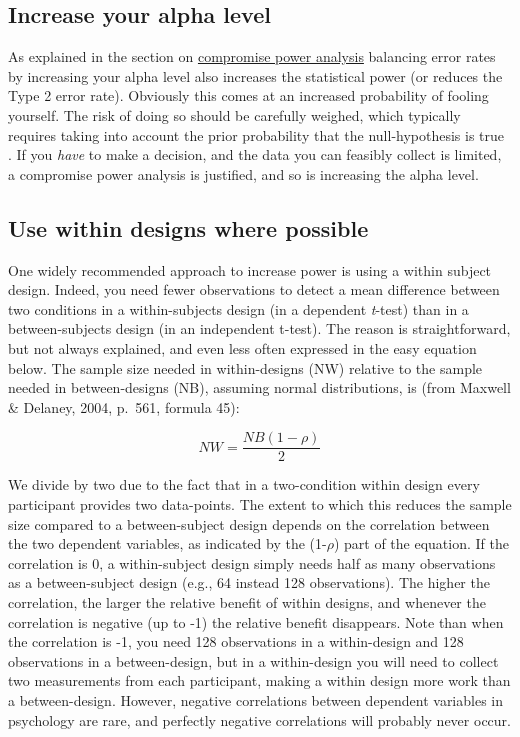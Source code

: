 \documentclass[
]{krantz}
\begin{document}
\hypertarget{increase-your-alpha-level}{%
\subsection{Increase your alpha level}\label{increase-your-alpha-level}}

As explained in the section on \protect\hyperlink{compromisepower}{compromise power analysis} balancing error rates by increasing your alpha level also increases the statistical power (or reduces the Type 2 error rate). Obviously this comes at an increased probability of fooling yourself. The risk of doing so should be carefully weighed, which typically requires taking into account the prior probability that the null-hypothesis is true \citep{miller_quest_2019}. If you \emph{have} to make a decision, and the data you can feasibly collect is limited, a compromise power analysis is justified, and so is increasing the alpha level.

\hypertarget{use-within-designs-where-possible}{%
\subsection{Use within designs where possible}\label{use-within-designs-where-possible}}

One widely recommended approach to increase power is using a within subject design. Indeed, you need fewer observations to detect a mean difference between two conditions in a within-subjects design (in a dependent \emph{t}-test) than in a between-subjects design (in an independent t-test). The reason is straightforward, but not always explained, and even less often expressed in the easy equation below. The sample size needed in within-designs (NW) relative to the sample needed in between-designs (NB), assuming normal distributions, is (from Maxwell \& Delaney, 2004, p.~561, formula 45):

\[NW = \frac{NB (1-\rho)}{2}\]

We divide by two due to the fact that in a two-condition within design every participant provides two data-points. The extent to which this reduces the sample size compared to a between-subject design depends on the correlation between the two dependent variables, as indicated by the (1-\(\rho\)) part of the equation. If the correlation is 0, a within-subject design simply needs half as many observations as a between-subject design (e.g., 64 instead 128 observations). The higher the correlation, the larger the relative benefit of within designs, and whenever the correlation is negative (up to -1) the relative benefit disappears. Note than when the correlation is -1, you need 128 observations in a within-design and 128 observations in a between-design, but in a within-design you will need to collect two measurements from each participant, making a within design more work than a between-design. However, negative correlations between dependent variables in psychology are rare, and perfectly negative correlations will probably never occur.
\end{document}
